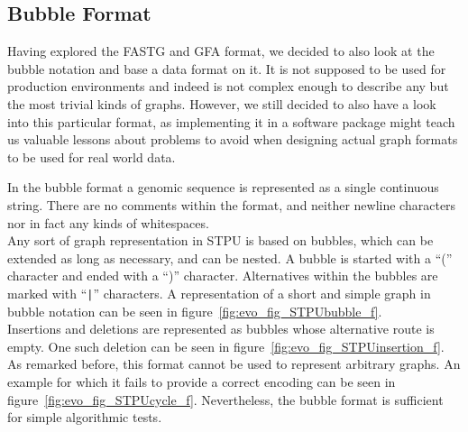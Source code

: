 \documentclass[a4paper,12pt,twoside,BCOR=10mm]{scrbook}
\def\pipe{\texttt{|}}
\begin{document}

\subsection{Bubble Format}

Having explored the FASTG and GFA format, we decided to also look 
at the bubble notation and base a data format on it. 
It is not supposed to be used for production environments and indeed 
is not complex enough to describe any but the most trivial kinds of graphs. 
However, we still decided to also have a look into this particular format, 
as implementing it in a software package might teach us valuable lessons 
about problems to avoid when designing actual graph formats to be used for real world data.

In the bubble format a genomic sequence is represented as a single continuous string. 
There are no comments within the format, 
and neither newline characters nor in fact any kinds of whitespaces. \\
Any sort of graph representation in STPU is based on bubbles, which can be extended as long as necessary, 
and can be nested. A bubble is started with a “(” character and ended 
with a “)” character. Alternatives within the bubbles are marked with “{\!\pipe}” 
characters. 
A representation of a short and simple graph in bubble notation can be seen in figure~\ref{fig:evo_fig_STPUbubble_f}. \\
Insertions and deletions are represented as bubbles whose alternative route is empty. 
One such deletion can be seen in figure~\ref{fig:evo_fig_STPUinsertion_f}. \\
As remarked before, this format cannot be used to represent arbitrary graphs. 
An example for which it fails to provide a correct encoding can be seen in figure~\ref{fig:evo_fig_STPUcycle_f}. 
Nevertheless, the bubble format is sufficient for simple algorithmic tests.
\end{document}

